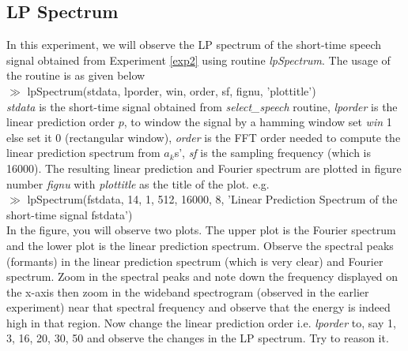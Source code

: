 \subsection{LP Spectrum}
\label{lp}
In this experiment, we will observe the LP spectrum of the short-time
speech signal obtained from Experiment \ref{exp2} using
routine {\it lpSpectrum}. The usage of the routine is as given below\\[2ex]
$\gg$ lpSpectrum(stdata, lporder, win, order, sf, fignu,
'plottitle')\\[2ex]
{\it stdata} is the short-time signal obtained from {\it
select\_speech} routine, {\it lporder} is the linear prediction order
$p$, to window the signal by a hamming window set {\it win} 1 else set
it 0 (rectangular window), {\it order} is the FFT order needed to
compute the linear prediction spectrum from $a_{k}$s', {\it sf} is the
sampling frequency (which is 16000). The resulting linear prediction
and Fourier spectrum are plotted in figure number {\it fignu} with
{\it plottitle} as the title of the plot. e.g.\\[2ex]
$\gg$ lpSpectrum(fstdata, 14, 1, 512, 16000, 8, 'Linear Prediction
Spectrum of the short-time signal fstdata')\\[2ex]
In the figure, you will observe two plots. The upper plot is the Fourier
spectrum and the lower plot is the linear prediction spectrum. Observe
the spectral peaks (formants) in the linear prediction spectrum (which
is very clear) and Fourier spectrum. Zoom in the spectral peaks and
note down the frequency displayed on the x-axis then zoom in the wideband
spectrogram (observed in the earlier experiment) near that spectral
frequency and observe that the energy is indeed high in that
region. Now change the linear prediction
order i.e. {\it lporder} to, say 1, 3, 16, 20, 30, 50 and observe the
changes in the LP spectrum. Try to reason it.

